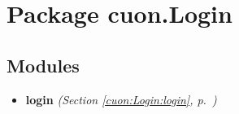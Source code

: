 %
%
%


\section{Package cuon.Login}

    \label{cuon:Login}


\subsection{Modules}

\begin{itemize}
\setlength{\parskip}{0ex}
\item \textbf{login}
  \textit{(Section \ref{cuon:Login:login}, p.~\pageref{cuon:Login:login})}

\end{itemize}

